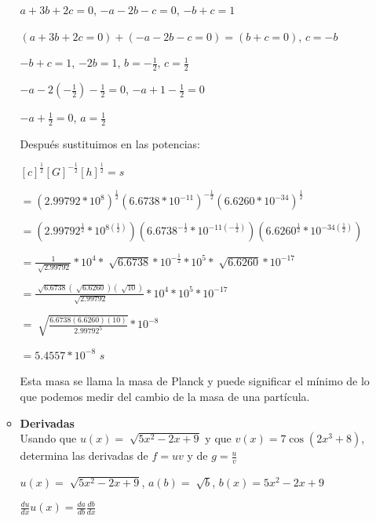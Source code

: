 \documentclass[10pt, a4paper]{article}
\begin{document}
\begin{enumerate}
\begin{itemize}
\begin{center}
                    $a+3b+2c=0$, $-a-2b-c=0$, $-b+c=1$

                    $(a+3b+2c=0)+(-a-2b-c=0)=(b+c=0)$, $c=-b$

                    $-b+c=1$, $-2b=1$, $b=-\frac{1}{2}$, $c=\frac{1}{2}$

                    $-a-2(-\frac{1}{2})-\frac{1}{2}=0$, $-a+1-\frac{1}{2}=0$

                    $-a+\frac{1}{2}=0$, $a=\frac{1}{2}$
                \end{center}

                Después sustituimos en las potencias:
                \begin{center}
                    $[c]^{\frac{1}{2}}[G]^{-\frac{1}{2}}[h]^{\frac{1}{2}}=\si{s}$

                    $=(2.99792 * 10^8)^{\frac{1}{2}}(6.6738 * 10^{-11})^{-\frac{1}{2}}(6.6260 * 10^{-34})^{\frac{1}{2}}$

                    $=(2.99792^{\frac{1}{2}} * 10^{8(\frac{1}{2})})(6.6738^{-\frac{1}{2}} * 10^{-11(-\frac{1}{2})})(6.6260^{\frac{1}{2}} * 10^{-34(\frac{1}{2})})$

                    $=\frac{1}{\sqrt[]{2.99792}} * 10^4 * \sqrt[]{6.6738} * 10^{-\frac{1}{2}} * 10^5 * \sqrt[]{6.6260} * 10^{-17}$

                    $=\frac{\sqrt[]{6.6738}(\sqrt[]{6.6260})(\sqrt[]{10})}{\sqrt[]{2.99792}}*10^4*10^5*10^{-17}$
                    
                    $=\sqrt[]{\frac{6.6738(6.6260)(10)}{2.99792^5}}*10^{-8}$

                    $=5.4557*10^{-8}$ $\si{s}$
                \end{center}

                Esta masa se llama la masa de Planck y puede significar el mínimo de lo que podemos medir 
                del cambio de la masa de una partícula.

                \item \textbf{Derivadas} \\
                Usando que $u(x) = \sqrt[]{5x^2-2x+9}$ y que $v(x) = 7\cos(2x^3 + 8)$, 
                determina las derivadas de $f = uv$ y de $g = \frac{u}{v}$

                \begin{center}
                    $u(x)=\sqrt[]{5x^2-2x+9}$, $a(b)=\sqrt[]{b}$, $b(x)=5x^2-2x+9$

                    $\frac{du}{dx}u(x)=\frac{da}{db}\frac{db}{dx}$


\end{center}
\end{itemize}
\end{enumerate}
\end{document}
